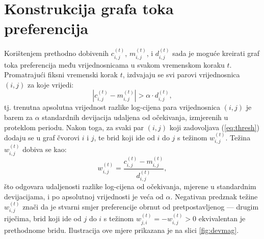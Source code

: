 \documentclass[lmodern, utf8, diplomski, numeric]{fer}
\newcommand{\q}{\left}
\newcommand{\w}{\right}
\begin{document}
  \section{Konstrukcija grafa toka preferencija}
  \label{sub:creating-graph}
  Korištenjem prethodno dobivenih $c_{i,j}^{\q(t\w)}$, $m_{i,j}^{\q(t\w)}$, i $d_{i,j}^{\q(t\w)}$ sada je moguće kreirati graf toka preferencija među vrijednosnicama u svakom vremenskom koraku $t$.
  Promatrajući fiksni vremenski korak $t$, izdvajaju se svi parovi vrijednosnica $(i,j)$ za koje vrijedi:
  \begin{equation}
  \label{eq:thresh}
  \q\lvert c_{i,j}^{\q(t\w)} - m_{i,j}^{\q(t\w)} \w\rvert > \alpha \cdot d_{i,j}^{\q(t\w)},
  \end{equation}
  tj. trenutna apsolutna vrijednost razlike log-cijena para vrijednosnica $(i,j)$ je barem za $\alpha$ standardnih devijacija udaljena od očekivanja, izmjerenih u proteklom periodu.
  Nakon toga, za svaki par $(i,j)$ koji zadovoljava (\ref{eq:thresh}) dodaju se u graf čvorovi $i$ i $j$, te brid koji ide od $i$ do $j$ s težinom $w_{i,j}^{\q(t\w)}$.
  Težina $w_{i,j}^{\q(t\w)}$ dobiva se kao:
  \begin{equation}
  \label{eq:weight}
  w_{i,j}^{\q(t\w)} = \frac{c_{i,j}^{\q(t\w)} - m_{i,j}^{\q(t\w)}}{d_{i,j}^{\q(t\w)}},
  \end{equation}
  što odgovara udaljenosti razlike log-cijena od očekivanja, mjerene u standardnim devijacijama, i po apsolutnoj vrijednosti je veća od $\alpha$.
  Negativan predznak težine $w_{i,j}^{\q(t\w)}$ znači da je stvarni smjer preferencije obrnut od pretpostavljenog --- drugim riječima, brid koji ide od $j$ do $i$ s težinom $w_{j,i}^{\q(t\w)} = -w_{i,j}^{\q(t\w)} > 0$ ekvivalentan je prethodnome bridu.
  Ilustracija ove mjere prikazana je na slici \ref{fig:devmag}.
  
\end{document}
